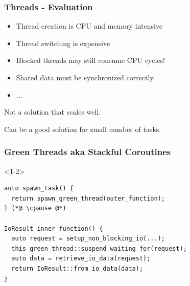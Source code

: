 \documentclass[aspectratio=169]{beamer}
\newif\iftransitions
\newcommand{\cpause}{\iftransitions \pause \fi}
\begin{document}
\begin{frame}
  \frametitle{Threads - Evaluation}

  \cpause
  \begin{itemize}
  \item Thread creation is CPU and memory intensive \cpause
  \item Thread switching is expensive \cpause
  \item Blocked threads may still consume CPU cycles! \cpause
  \item Shared data must be synchronized correctly. \cpause
  \item ... \cpause
  \end{itemize}

  Not a solution that scales well.

  Can be a good solution for small number of tasks.
\end{frame}

\begin{frame}[fragile]
  \frametitle{Green Threads aka Stackful Coroutines}

  \begin{onlyenv}<1-2>
  \begin{lstlisting}[style=cpp20]
auto spawn_task() {
  return spawn_green_thread(outer_function);
} (*@ \cpause @*)

IoResult inner_function() {
  auto request = setup_non_blocking_io(...);
  this_green_thread::suspend_waiting_for(request);
  auto data = retrieve_io_data(request);
  return IoResult::from_io_data(data);
}
  \end{lstlisting}
  \end{onlyenv}

\end{frame}
\end{document}
